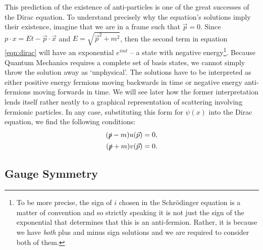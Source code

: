 This prediction of the existence of anti-particles is one of the great successes of the Dirac equation. To understand precisely why the equation's solutions imply their existence, imagine that we are in a frame such that $\vec{p} = 0$. Since $p \cdot x = Et - \vec{p}\cdot \vec{x}$ and $E = \sqrt{\vec{p}^2 + m^2}$, then the second term in equation \ref{eqn:dirac} will have an exponential $e^{i m t}$ -- a state with negative energy\footnote{To be more precise, the sign of $i$ chosen in the Schr\"odinger equation is a matter of convention and so strictly speaking it is not just the sign of the exponential that determines that this is an anti-fermion. Rather, it is because we have \emph{both} plus and minus sign solutions and we are required to consider both of them.}. Because Quantum Mechanics requires a complete set of basis states, we cannot simply throw the solution away as `unphysical'. The solutions have to be interpreted as either positive energy fermions moving backwards in time or negative energy anti-fermions moving forwards in time. We will see later how the former interpretation lends itself rather neatly to a graphical representation of scattering involving fermionic particles. In any case, substituting this form for $\psi(x)$ into the Dirac equation, we find the following conditions:
\begin{subequations}
\begin{align}
(\slashed{p} - m)u(\vec{p}) &= 0, \\
(\slashed{p} + m)v(\vec{p}) &= 0.
\end{align}
\end{subequations}

\subsection{Gauge Symmetry}

